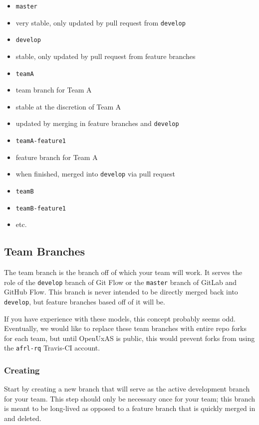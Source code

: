 \begin{itemize}
\item
  \texttt{master}
\item
  very stable, only updated by pull request from \texttt{develop}
\item
  \texttt{develop}
\item
  stable, only updated by pull request from feature branches
\item
  \texttt{teamA}
\item
  team branch for Team A
\item
  stable at the discretion of Team A
\item
  updated by merging in feature branches and \texttt{develop}
\item
  \texttt{teamA-feature1}
\item
  feature branch for Team A
\item
  when finished, merged into \texttt{develop} via pull request
\item
  \texttt{teamB}
\item
  \texttt{teamB-feature1}
\item
  etc.
\end{itemize}

\subsection{Team Branches}\label{team-branches}

The team branch is the branch off of which your team will work. It
serves the role of the \texttt{develop} branch of Git Flow or the
\texttt{master} branch of GitLab and GitHub Flow. This branch is never
intended to be directly merged back into \texttt{develop}, but feature
branches based off of it will be.

If you have experience with these models, this concept probably seems
odd. Eventually, we would like to replace these team branches with
entire repo forks for each team, but until OpenUxAS is public, this
would prevent forks from using the \texttt{afrl-rq} Travis-CI account.

\subsubsection{Creating}\label{creating}

Start by creating a new branch that will serve as the active development
branch for your team. This step should only be necessary once for your
team; this branch is meant to be long-lived as opposed to a feature
branch that is quickly merged in and deleted.

